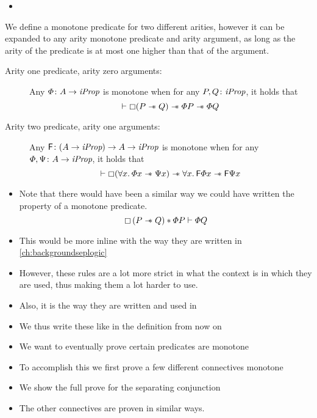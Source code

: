 \documentclass[thesis.tex]{subfiles}
\begin{document}
\begin{itemize}
    \item
\end{itemize}
\begin{definition}
    We define a monotone predicate for two different arities, however it can be expanded to any arity monotone predicate and arity argument, as long as the arity of the predicate is at most one higher than that of the argument.
    \begin{description}
        \item[Arity one predicate, arity zero arguments:] Any $\varPhi\colon A \to \textit{iProp}$ is monotone when for any $P, Q\colon \textit{iProp}$, it holds that
            \[\vdash \mathop{\boxempty}(P \mathrel{-\!\!\ast} Q) \mathrel{-\!\!\ast} \varPhi P \mathrel{-\!\!\ast} \varPhi Q\]
        \item[Arity two predicate, arity one arguments:] Any $\textsf{\upshape F}\colon (A \to \textit{iProp}) \to  A \to \textit{iProp}$ is monotone when for any $\varPhi, \Psi\colon A \to \textit{iProp}$, it holds that
            \[\proves \always(\All \var. \pred\var \wand \predB\var) \wand \All \var. \hopred\pred\var \wand \hopred\predB\var\]
    \end{description}
\end{definition}
\begin{itemize}
    \item Note that there would have been a similar way we could have written the property of a monotone predicate.
          \[
              \mathop{\boxempty}{(P \mathrel{-\!\!\ast} Q)} * \varPhi P \vdash \varPhi Q
          \]
    \item This would be more inline with the way they are written in \cref*{ch:backgroundseplogic}
    \item However, these rules are a lot more strict in what the context is in which they are used, thus making them a lot harder to use.
    \item Also, it is the way they are written and used in \iris
    \item We thus write these like in the definition from now on
\end{itemize}

\begin{itemize}
    \item We want to eventually prove certain predicates are monotone
    \item To accomplish this we first prove a few different connectives monotone
    \item We show the full prove for the separating conjunction
    \item The other connectives are proven in similar ways.
\end{itemize}
\end{document}
